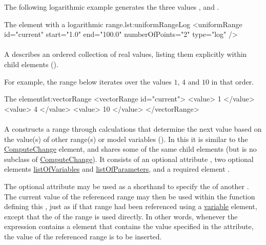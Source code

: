 The following logarithmic example generates the three values ,  and .
\begin{myXmlLst}{The  element with a logarithmic range.}{lst:uniformRangeLog}
<uniformRange id="current" start="1.0" end="100.0" numberOfPoints="2" type="log" />
\end{myXmlLst}

\paragraph{}
\label{class:vectorRange}

A  describes an ordered collection of real values, listing them explicitly within child  elements ().

For example, the range below iterates over the values $1$, $4$ and $10$ in that order.
\begin{myXmlLst}{The  element}{lst:vectorRange}
<vectorRange id="current"> 
	<value> 1 </value> 
	<value> 4 </value> 
	<value> 10 </value> 
</vectorRange> 
\end{myXmlLst}

\paragraph{}
\label{class:functionalRange}
A  constructs a range through calculations that determine the next value based on the value(s) of other range(s) or model variables (). In this it is similar to the \hyperref[class:computeChange]{ComputeChange} element, and shares some of the same child elements (but is no subclass of \hyperref[class:computeChange]{ComputeChange}). It consists of an optional attribute , two optional elements \hyperref[sec:listOfVariables]{listOfVariables} and \hyperref[sec:listOfParameters]{listOfParameters}, and a required element .

The optional attribute  may be used as a shorthand to specify the  of another . The current value of the referenced range may then be used within the function defining this , just as if that range had been referenced using a \hyperref[class:variable]{variable} element, except that the  of the range is used directly. In other words, whenever the expression contains a  element that contains the value specified in the  attribute, the value of the referenced range is to be inserted.

